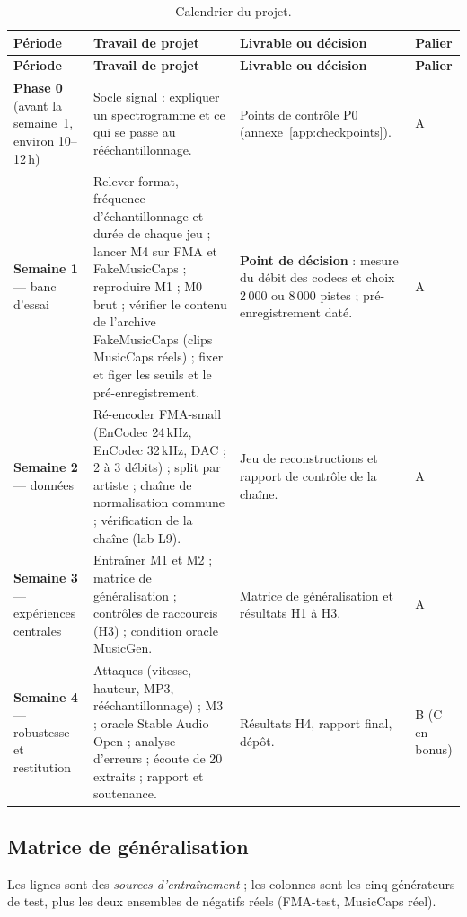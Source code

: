 \documentclass[11pt,a4paper]{article}
\begin{document}
{\small
\begin{longtable}{L{2.6cm}L{6.4cm}L{4.4cm}L{1.6cm}}
\caption{Calendrier du projet.}\label{tab:calendrier}\\
\toprule
\textbf{Période} & \textbf{Travail de projet} & \textbf{Livrable ou décision} & \textbf{Palier}\\
\midrule
\endfirsthead
\toprule
\textbf{Période} & \textbf{Travail de projet} & \textbf{Livrable ou décision} & \textbf{Palier}\\
\midrule
\endhead
\bottomrule
\endfoot
\textbf{Phase 0} (avant la semaine~1, environ 10--12\,h) & Socle signal : expliquer un spectrogramme et ce qui se passe au rééchantillonnage. & Points de contrôle P0 (annexe~\ref{app:checkpoints}). & A\\
\textbf{Semaine 1} --- banc d'essai & Relever format, fréquence d'échantillonnage et durée de chaque jeu ; lancer M4 sur FMA et FakeMusicCaps ; reproduire M1 ; M0 brut ; vérifier le contenu de l'archive FakeMusicCaps (clips MusicCaps réels) ; fixer et figer les seuils et le pré-enregistrement. & \textbf{Point de décision} : mesure du débit des codecs et choix 2\,000 ou 8\,000 pistes ; pré-enregistrement daté. & A\\
\textbf{Semaine 2} --- données & Ré-encoder FMA-small (EnCodec 24\,kHz, EnCodec 32\,kHz, DAC ; 2 à 3 débits) ; split par artiste ; chaîne de normalisation commune ; vérification de la chaîne (lab L9). & Jeu de reconstructions et rapport de contrôle de la chaîne. & A\\
\textbf{Semaine 3} --- expériences centrales & Entraîner M1 et M2 ; matrice de généralisation ; contrôles de raccourcis (H3) ; condition oracle MusicGen. & Matrice de généralisation et résultats H1 à H3. & A\\
\textbf{Semaine 4} --- robustesse et restitution & Attaques (vitesse, hauteur, MP3, rééchantillonnage) ; M3 ; oracle Stable Audio Open ; analyse d'erreurs ; écoute de 20 extraits ; rapport et soutenance. & Résultats H4, rapport final, dépôt. & B (C en bonus)\\
\end{longtable}
}

\subsection{Matrice de généralisation}

Les lignes sont des \emph{sources d'entraînement} ; les colonnes sont les cinq générateurs de test, plus les deux ensembles de négatifs réels (FMA-test, MusicCaps réel).
\end{document}
